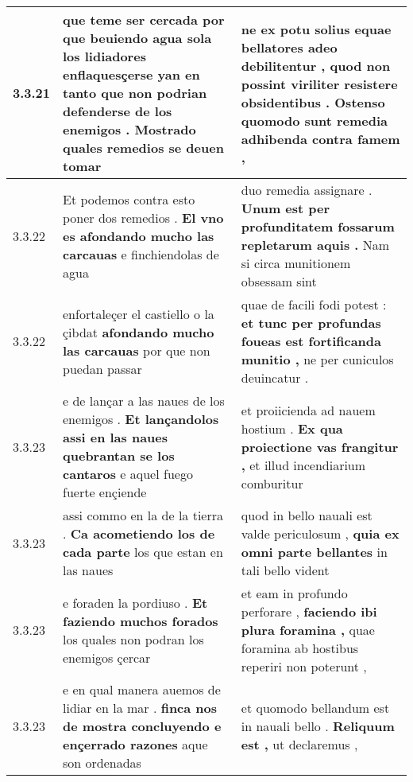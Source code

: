 \begin{tabular}{|p{1cm}|p{6.5cm}|p{6.5cm}|}
3.3.21 & que teme ser cercada \textbf{ por que beuiendo agua sola los lidiadores enflaquesçerse yan en tanto que non podrian defenderse de los enemigos . } Mostrado quales remedios se deuen tomar & ne ex potu solius equae bellatores adeo debilitentur , \textbf{ quod non possint viriliter resistere obsidentibus . } Ostenso quomodo sunt remedia adhibenda contra famem , \\\hline
3.3.22 & Et podemos contra esto poner dos remedios . \textbf{ El vno es afondando mucho las carcauas } e finchiendolas de agua & duo remedia assignare . \textbf{ Unum est per profunditatem fossarum repletarum aquis . } Nam si circa munitionem obsessam sint \\\hline
3.3.22 & enfortaleçer el castiello o la çibdat \textbf{ afondando mucho las carcauas } por que non puedan passar & quae de facili fodi potest : \textbf{ et tunc per profundas foueas est fortificanda munitio , } ne per cuniculos deuincatur . \\\hline
3.3.23 & e de lançar a las naues de los enemigos . \textbf{ Et lançandolos assi en las naues quebrantan se los cantaros } e aquel fuego fuerte ençiende & et proiicienda ad nauem hostium . \textbf{ Ex qua proiectione vas frangitur , } et illud incendiarium comburitur \\\hline
3.3.23 & assi commo en la de la tierra . \textbf{ Ca acometiendo los de cada parte } los que estan en las naues & quod in bello nauali est valde periculosum , \textbf{ quia ex omni parte bellantes } in tali bello vident \\\hline
3.3.23 & e foraden la pordiuso . \textbf{ Et faziendo muchos forados } los quales non podran los enemigos çercar & et eam in profundo perforare , \textbf{ faciendo ibi plura foramina , } quae foramina ab hostibus reperiri non poterunt , \\\hline
3.3.23 & e en qual manera auemos de lidiar en la mar . \textbf{ finca nos de mostra concluyendo e ençerrado razones } aque son ordenadas & et quomodo bellandum est in nauali bello . \textbf{ Reliquum est , } ut declaremus , \\\hline

\end{tabular}
